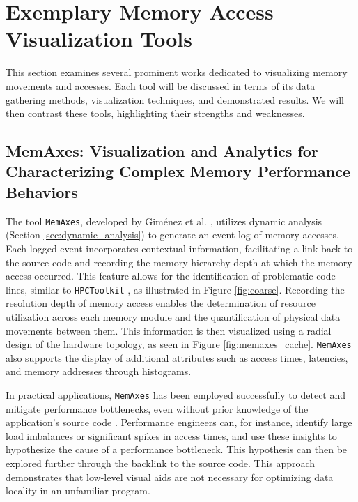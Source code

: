 \section{Exemplary Memory Access Visualization Tools}\label{sec:works}
This section examines several prominent works dedicated to visualizing memory movements and accesses. Each tool will be discussed in terms of its data gathering methods, visualization techniques, and demonstrated results. We will then contrast these tools, highlighting their strengths and weaknesses.

\subsection{MemAxes: Visualization and Analytics for Characterizing Complex Memory Performance Behaviors}\label{sec:memaxes}
The tool \texttt{MemAxes}, developed by Giménez et al. \cite{gimenez2017memaxes}, utilizes dynamic analysis (Section \ref{sec:dynamic_analysis}) to generate an event log of memory accesses. Each logged event incorporates contextual information, facilitating a link back to the source code and recording the memory hierarchy depth at which the memory access occurred. This feature allows for the identification of problematic code lines, similar to \texttt{HPCToolkit} \cite{adhianto2010hpctoolkit}, as illustrated in Figure \ref{fig:coarse}. Recording the resolution depth of memory access enables the determination of resource utilization across each memory module and the quantification of physical data movements between them. This information is then visualized using a radial design of the hardware topology, as seen in Figure \ref{fig:memaxes_cache}. \texttt{MemAxes} also supports the display of additional attributes such as access times, latencies, and memory addresses through histograms.

In practical applications, \texttt{MemAxes} has been employed successfully to detect and mitigate performance bottlenecks, even without prior knowledge of the application's source code \cite{gimenez2017memaxes}. Performance engineers can, for instance, identify large load imbalances or significant spikes in access times, and use these insights to hypothesize the cause of a performance bottleneck. This hypothesis can then be explored further through the backlink to the source code. This approach demonstrates that low-level visual aids are not necessary for optimizing data locality in an unfamiliar program.

